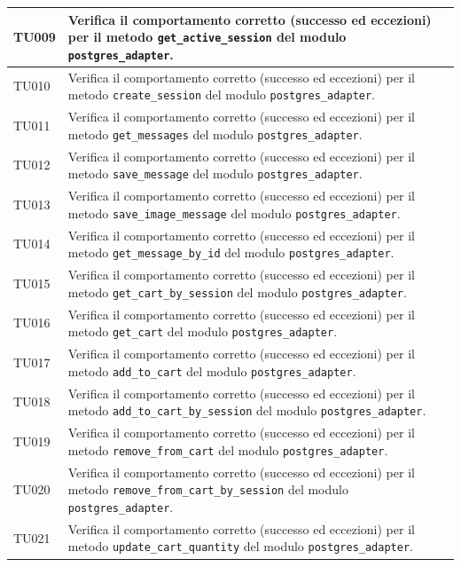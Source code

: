 \documentclass[a4paper,11pt,oneside]{scrartcl}
\begin{document}
\begin{longtable}{|p{1.9cm}|p{11.6cm}|c|}
TU009 & Verifica il comportamento corretto (successo ed eccezioni) per il metodo \texttt{get\_active\_session} del modulo \texttt{postgres\_adapter}. & \\ \hline
TU010 & Verifica il comportamento corretto (successo ed eccezioni) per il metodo \texttt{create\_session} del modulo \texttt{postgres\_adapter}. & \\ \hline
TU011 & Verifica il comportamento corretto (successo ed eccezioni) per il metodo \texttt{get\_messages} del modulo \texttt{postgres\_adapter}. & \\ \hline
TU012 & Verifica il comportamento corretto (successo ed eccezioni) per il metodo \texttt{save\_message} del modulo \texttt{postgres\_adapter}. & \\ \hline
TU013 & Verifica il comportamento corretto (successo ed eccezioni) per il metodo \texttt{save\_image\_message} del modulo \texttt{postgres\_adapter}. & \\ \hline
TU014 & Verifica il comportamento corretto (successo ed eccezioni) per il metodo \texttt{get\_message\_by\_id} del modulo \texttt{postgres\_adapter}. & \\ \hline
TU015 & Verifica il comportamento corretto (successo ed eccezioni) per il metodo \texttt{get\_cart\_by\_session} del modulo \texttt{postgres\_adapter}. & \\ \hline
TU016 & Verifica il comportamento corretto (successo ed eccezioni) per il metodo \texttt{get\_cart} del modulo \texttt{postgres\_adapter}. & \\ \hline
TU017 & Verifica il comportamento corretto (successo ed eccezioni) per il metodo \texttt{add\_to\_cart} del modulo \texttt{postgres\_adapter}. & \\ \hline
TU018 & Verifica il comportamento corretto (successo ed eccezioni) per il metodo \texttt{add\_to\_cart\_by\_session} del modulo \texttt{postgres\_adapter}. & \\ \hline
TU019 & Verifica il comportamento corretto (successo ed eccezioni) per il metodo \texttt{remove\_from\_cart} del modulo \texttt{postgres\_adapter}. & \\ \hline
TU020 & Verifica il comportamento corretto (successo ed eccezioni) per il metodo \texttt{remove\_from\_cart\_by\_session} del modulo \texttt{postgres\_adapter}. & \\ \hline
TU021 & Verifica il comportamento corretto (successo ed eccezioni) per il metodo \texttt{update\_cart\_quantity} del modulo \texttt{postgres\_adapter}. & \\ \hline

\end{longtable}
\end{document}
